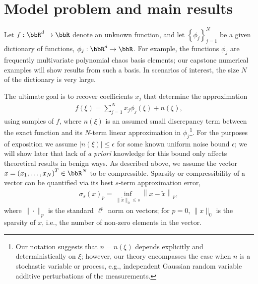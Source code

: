 \section{Model problem and main results}\label{sec:notation}

Let $f: \bbR^d \rightarrow \bbR$ denote an unknown function, and let $\left\{ \phi_j\right\}_{j=1}^N$ be a given dictionary of functions, $\phi_j : \bbR^d \rightarrow \bbR$. For example, the functions $\phi_j$ are frequently multivariate polynomial chaos basis elements; our capstone numerical examples will show results from such a basis. In scenarios of interest, the size $N$ of the dictionary is very large.

The ultimate goal is to recover coefficients $x_j$ that determine the approximation
\begin{align}\label{eq:f-definition}
  f(\xi) = \sum_{j=1}^N x_j \phi_j(\xi) + n(\xi),
\end{align}
using samples of $f$, where $n(\xi)$ is an assumed small discrepancy term between the exact function and its $N$-term linear approximation in $\phi_j$\footnote{Our notation suggests that $n = n(\xi)$ depends explicitly and deterministically on $\xi$; however, our theory encompasses the case when $n$ is a stochastic variable or process, e.g., independent Gaussian random variable additive perturbations of the measurements.}. For the purposes of exposition we assume $| n(\xi)| \leq \epsilon$ for some known uniform noise bound $\epsilon$; we will show later that lack of \textit{a priori} knowledge for this bound only affects theoretical results in benign ways. As described above, we assume the vector $x = \left(x_1, \ldots, x_N \right)^T \in \bbR^N$ to be compressible. Sparsity or compressibility of a vector can be quantified via its best $s$-term approximation error,
\begin{align*}
  \sigma_{s}(x)_p = \inf_{\|\tilde{x}\|_0 \leq s} \left\| x - \tilde{x} \right\|_p,
\end{align*}
where $\|\cdot\|_p$ is the standard $\ell^p$ norm on vectors; for $p=0$, $\| x \|_0$ is the sparsity of $x$, i.e., the number of non-zero elements in the vector.


